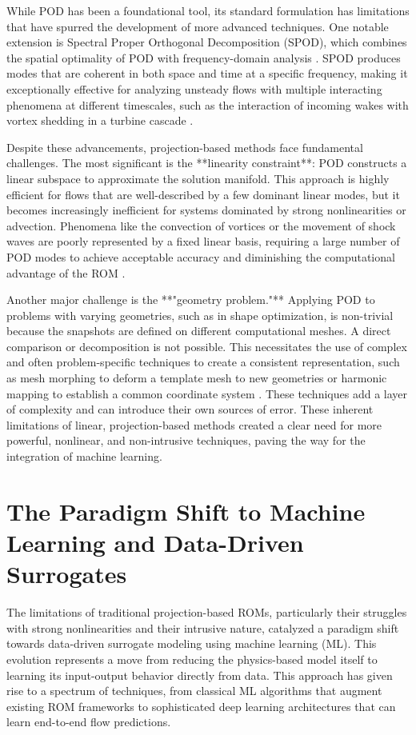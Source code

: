 \documentclass[dsc, EN]{ufabcFHZh}
\begin{document}
While POD has been a foundational tool, its standard formulation has limitations that have spurred the development of more advanced techniques. One notable extension is Spectral Proper Orthogonal Decomposition (SPOD), which combines the spatial optimality of POD with frequency-domain analysis \citep{GPPS-TC-2024_paper_034, Towne2018}. SPOD produces modes that are coherent in both space and time at a specific frequency, making it exceptionally effective for analyzing unsteady flows with multiple interacting phenomena at different timescales, such as the interaction of incoming wakes with vortex shedding in a turbine cascade \citep{synthesized2024}.

Despite these advancements, projection-based methods face fundamental challenges. The most significant is the **linearity constraint**: POD constructs a linear subspace to approximate the solution manifold. This approach is highly efficient for flows that are well-described by a few dominant linear modes, but it becomes increasingly inefficient for systems dominated by strong nonlinearities or advection. Phenomena like the convection of vortices or the movement of shock waves are poorly represented by a fixed linear basis, requiring a large number of POD modes to achieve acceptable accuracy and diminishing the computational advantage of the ROM \citep{synthesized2024}.

Another major challenge is the **"geometry problem."** Applying POD to problems with varying geometries, such as in shape optimization, is non-trivial because the snapshots are defined on different computational meshes. A direct comparison or decomposition is not possible. This necessitates the use of complex and often problem-specific techniques to create a consistent representation, such as mesh morphing to deform a template mesh to new geometries or harmonic mapping to establish a common coordinate system \citep{synthesized2024}. These techniques add a layer of complexity and can introduce their own sources of error. These inherent limitations of linear, projection-based methods created a clear need for more powerful, nonlinear, and non-intrusive techniques, paving the way for the integration of machine learning.

\section{The Paradigm Shift to Machine Learning and Data-Driven Surrogates}

The limitations of traditional projection-based ROMs, particularly their struggles with strong nonlinearities and their intrusive nature, catalyzed a paradigm shift towards data-driven surrogate modeling using machine learning (ML). This evolution represents a move from reducing the physics-based model itself to learning its input-output behavior directly from data. This approach has given rise to a spectrum of techniques, from classical ML algorithms that augment existing ROM frameworks to sophisticated deep learning architectures that can learn end-to-end flow predictions.
\end{document}
